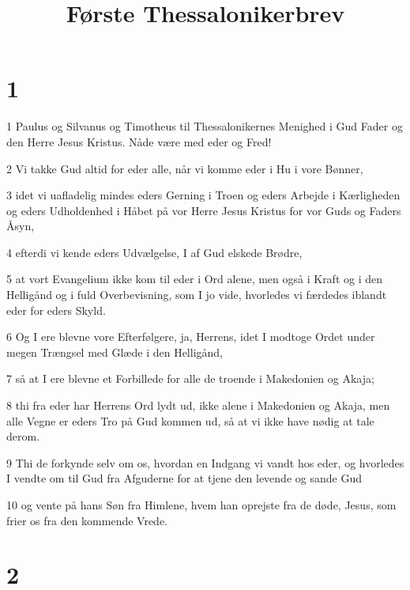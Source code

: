 

\title{Første Thessalonikerbrev}


\chapter{1}

\par 1 Paulus og Silvanus og Timotheus til Thessalonikernes Menighed i Gud Fader og den Herre Jesus Kristus. Nåde være med eder og Fred!
\par 2 Vi takke Gud altid for eder alle, når vi komme eder i Hu i vore Bønner,
\par 3 idet vi uafladelig mindes eders Gerning i Troen og eders Arbejde i Kærligheden og eders Udholdenhed i Håbet på vor Herre Jesus Kristus for vor Guds og Faders Åsyn,
\par 4 efterdi vi kende eders Udvælgelse, I af Gud elskede Brødre,
\par 5 at vort Evangelium ikke kom til eder i Ord alene, men også i Kraft og i den Helligånd og i fuld Overbevisning, som I jo vide, hvorledes vi færdedes iblandt eder for eders Skyld.
\par 6 Og I ere blevne vore Efterfølgere, ja, Herrens, idet I modtoge Ordet under megen Trængsel med Glæde i den Helligånd,
\par 7 så at I ere blevne et Forbillede for alle de troende i Makedonien og Akaja;
\par 8 thi fra eder har Herrens Ord lydt ud, ikke alene i Makedonien og Akaja, men alle Vegne er eders Tro på Gud kommen ud, så at vi ikke have nødig at tale derom.
\par 9 Thi de forkynde selv om os, hvordan en Indgang vi vandt hos eder, og hvorledes I vendte om til Gud fra Afguderne for at tjene den levende og sande Gud
\par 10 og vente på hans Søn fra Himlene, hvem han oprejste fra de døde, Jesus, som frier os fra den kommende Vrede.

\chapter{2}

